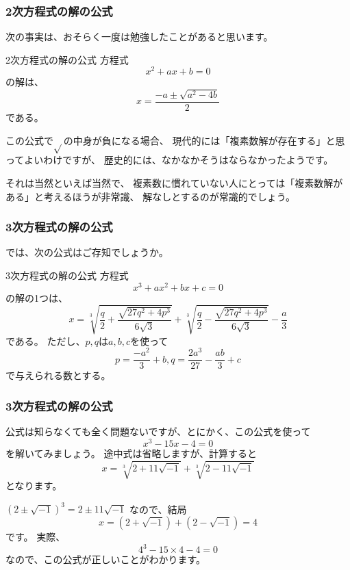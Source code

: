 \documentclass[dvipdfmx]{beamer}
\begin{document}
  \begin{frame}
    \frametitle{2次方程式の解の公式}

    次の事実は、おそらく一度は勉強したことがあると思います。
    \begin{block}{2次方程式の解の公式}
      方程式
      \[
        x^2 + ax + b = 0
      \]
      の解は、
      \[
        x = \frac{-a \pm \sqrt{a^2 - 4b}}{2}
      \]
      である。
    \end{block}
    この公式で$\sqrt{}$の中身が負になる場合、
    現代的には「複素数解が存在する」と思ってよいわけですが、
    歴史的には、なかなかそうはならなかったようです。

    それは当然といえば当然で、
    複素数に慣れていない人にとっては「複素数解がある」と考えるほうが非常識、
    解なしとするのが常識的でしょう。

  \end{frame}

  \begin{frame}
    \frametitle{3次方程式の解の公式}

    では、次の公式はご存知でしょうか。
    \begin{block}{3次方程式の解の公式}
      方程式
      \[
        x^3 + ax^2 + bx + c = 0
      \]
      の解の1つは、
      \[
        x = \sqrt[3]{\frac{q}{2} + \frac{\sqrt{27q^2 + 4p^3}}{6\sqrt{3}}} + \sqrt[3]{\frac{q}{2} - \frac{\sqrt{27q^2 + 4p^3}}{6\sqrt{3}}} - \frac{a}{3}
      \]
      である。
      ただし、$p, q$は$a, b, c$を使って
      \[
        p = \frac{-a^2}{3} + b, q = \frac{2a^3}{27} - \frac{ab}{3} + c
      \]
      で与えられる数とする。
    \end{block}

  \end{frame}

  \begin{frame}
    \frametitle{3次方程式の解の公式}

    公式は知らなくても全く問題ないですが、とにかく、この公式を使って
    \[
      x^3 - 15x - 4 = 0
    \]
    を解いてみましょう。
    途中式は省略しますが、計算すると
    \[
      x = \sqrt[3]{2 + 11\sqrt{-1}} + \sqrt[3]{2 - 11\sqrt{-1}}
    \]
    となります。

    \pause

    $(2 \pm \sqrt{-1})^3 = 2 \pm 11\sqrt{-1}$ なので、結局
    \[
      x = (2 + \sqrt{-1}) + (2 - \sqrt{-1}) = 4
    \]
    です。
    実際、
    \[
      4^3 - 15 \times 4 - 4 = 0
    \]
    なので、この公式が正しいことがわかります。

  \end{frame}
\end{document}

